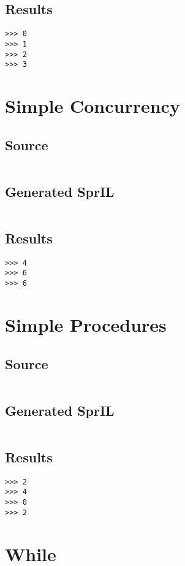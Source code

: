 \documentclass[twoside]{report}
\begin{document}
\subsection{Results}
\begin{verbatim}
>>> 0
>>> 1
>>> 2
>>> 3
\end{verbatim}

\section{Simple Concurrency}
\subsection{Source}
\inputminted[tabsize=4,linenos,firstnumber=1]{text}{../test/simple_concurrency.shl}
\subsection{Generated SprIL}
\inputminted[tabsize=4,linenos,firstnumber=0]{text}{../test/simple_concurrency_gen.txt}
\subsection{Results}
\begin{verbatim}
>>> 4
>>> 6
>>> 6
\end{verbatim}

\section{Simple Procedures}
\subsection{Source}
\inputminted[tabsize=4,linenos,firstnumber=1]{text}{../test/simple_proc.shl}
\subsection{Generated SprIL}
\inputminted[tabsize=4,linenos,firstnumber=0]{text}{../test/simple_proc_gen.txt}
\subsection{Results}
\begin{verbatim}
>>> 2
>>> 4
>>> 0
>>> 2
\end{verbatim}

\section{While}
\end{document}
